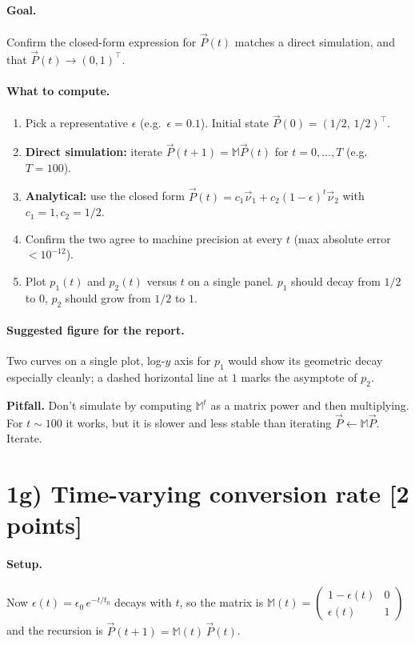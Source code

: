 \documentclass[12pt,a4paper]{article}
\newcommand{\M}{\mathbb{M}}
\newcommand{\vnu}{\vec{\nu}}
\newcommand{\vP}{\vec{P}}
\begin{document}
\paragraph{Goal.} Confirm the closed-form expression for $\vP(t)$ matches a direct simulation, and that $\vP(t) \to (0,1)^{\top}$.

\paragraph{What to compute.}
\begin{enumerate}[label=(\arabic*),leftmargin=*]
    \item Pick a representative $\epsilon$ (e.g.~$\epsilon = 0.1$). Initial state $\vP(0) = (1/2,\, 1/2)^{\top}$.
    \item \textbf{Direct simulation:} iterate $\vP(t+1) = \M\vP(t)$ for $t = 0,\dots,T$ (e.g.~$T=100$).
    \item \textbf{Analytical:} use the closed form $\vP(t) = c_1\vnu_1 + c_2(1-\epsilon)^t\vnu_2$ with $c_1 = 1, c_2 = 1/2$.
    \item Confirm the two agree to machine precision at every $t$ (max absolute error $< 10^{-12}$).
    \item Plot $p_1(t)$ and $p_2(t)$ versus $t$ on a single panel. $p_1$ should decay from $1/2$ to $0$, $p_2$ should grow from $1/2$ to $1$.
\end{enumerate}

\paragraph{Suggested figure for the report.} Two curves on a single plot, log-$y$ axis for $p_1$ would show its geometric decay especially cleanly; a dashed horizontal line at $1$ marks the asymptote of $p_2$.

\begin{warn}
\textbf{Pitfall.} Don't simulate by computing $\M^t$ as a matrix power and then multiplying. For $t\sim 100$ it works, but it is slower and less stable than iterating $\vP \leftarrow \M\vP$. Iterate.
\end{warn}

\section*{1g) Time-varying conversion rate [2 points]}

\paragraph{Setup.} Now $\epsilon(t) = \epsilon_0\,e^{-t/t_0}$ decays with $t$, so the matrix is $\M(t) = \begin{pmatrix} 1-\epsilon(t) & 0\\ \epsilon(t) & 1\end{pmatrix}$ and the recursion is $\vP(t+1) = \M(t)\,\vP(t)$.
\end{document}
